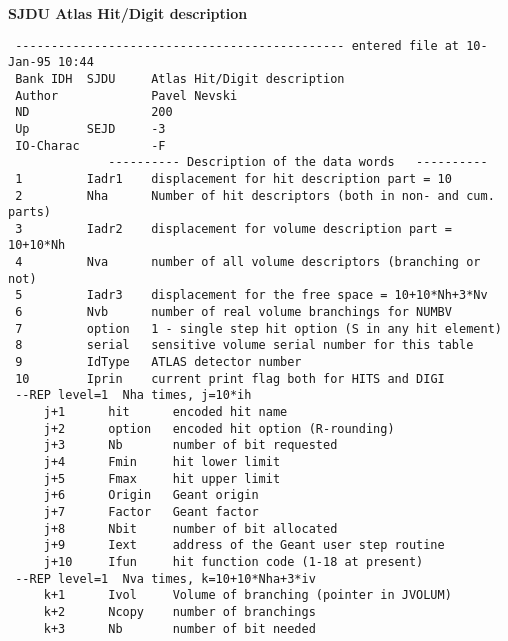 {\large \bf \sf SJDU Atlas Hit/Digit description}
\begin{verbatim}
 ---------------------------------------------- entered file at 10-Jan-95 10:44
 Bank IDH  SJDU     Atlas Hit/Digit description                                 
 Author             Pavel Nevski                                                
 ND                 200                                                             
 Up        SEJD     -3                                                          
 IO-Charac          -F                                                          
              ---------- Description of the data words   ----------
 1         Iadr1    displacement for hit description part = 10                  
 2         Nha      Number of hit descriptors (both in non- and cum. parts)     
 3         Iadr2    displacement for volume description part = 10+10*Nh         
 4         Nva      number of all volume descriptors (branching or not)         
 5         Iadr3    displacement for the free space = 10+10*Nh+3*Nv             
 6         Nvb      number of real volume branchings for NUMBV                       
 7         option   1 - single step hit option (S in any hit element)                                                             
 8         serial   sensitive volume serial number for this table                                                             
 9         IdType   ATLAS detector number                                       
 10        Iprin    current print flag both for HITS and DIGI                   
 --REP level=1  Nha times, j=10*ih
     j+1      hit      encoded hit name                                          
     j+2      option   encoded hit option (R-rounding)                                       
     j+3      Nb       number of bit requested                                   
     j+4      Fmin     hit lower limit                                             
     j+5      Fmax     hit upper limit                                           
     j+6      Origin   Geant origin                                              
     j+7      Factor   Geant factor                                              
     j+8      Nbit     number of bit allocated                                   
     j+9      Iext     address of the Geant user step routine                    
     j+10     Ifun     hit function code (1-18 at present)                       
 --REP level=1  Nva times, k=10+10*Nha+3*iv 
     k+1      Ivol     Volume of branching (pointer in JVOLUM)                   
     k+2      Ncopy    number of branchings                                      
     k+3      Nb       number of bit needed                                      
\end{verbatim}

